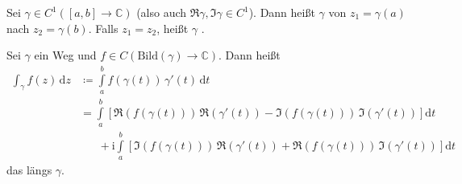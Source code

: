 \documentclass[a4paper,10pt]{scrbook}
\begin{document}
\begin{theorem}[Definition]
  \begin{enum-arab}
    \item Sei $\gamma \in C^1([a,b] \to \mathbb{C})$ (also auch $\Re \gamma, \Im \gamma \in C^1$). Dann heißt $\gamma$  von $z_1 = \gamma(a)$ nach $z_2 = \gamma(b)$. Falls $z_1 = z_2$, heißt $\gamma$ .

    \item Sei $\gamma$ ein Weg und $f \in C(\mathrm{Bild}(\gamma) \to \mathbb{C})$. Dann heißt
    \begin{align*}
      \int_\gamma f(z) \, \mathrm{d}z &\coloneq \int\limits_{a}^{b} f(\gamma(t)) \, \gamma'(t) \, \mathrm{d}t \\
      &= \int\limits_{a}^{b} \left[ \Re(f(\gamma(t))) \, \Re(\gamma'(t)) - \Im(f(\gamma(t))) \, \Im(\gamma'(t)) \right] \mathrm{d}t \\
      &\phantom{=\;} + \mathrm{i} \int\limits_{a}^{b} \left[ \Im(f(\gamma(t))) \, \Re(\gamma'(t)) + \Re(f(\gamma(t))) \, \Im(\gamma'(t)) \right] \mathrm{d}t
    \end{align*}
    das  längs $\gamma$.
  \end{enum-arab}
\end{theorem}
\end{document}
